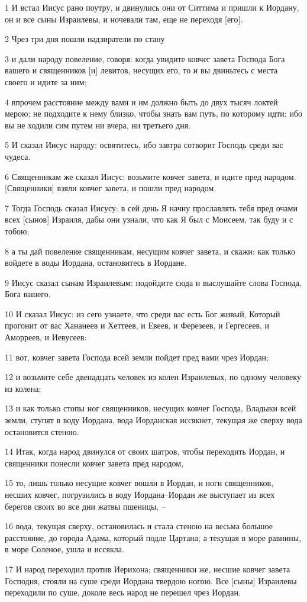 \par 1 И встал Иисус рано поутру, и двинулись они от Ситтима и пришли к Иордану, он и все сыны Израилевы, и ночевали там, еще не переходя [его].
\par 2 Чрез три дня пошли надзиратели по стану
\par 3 и дали народу повеление, говоря: когда увидите ковчег завета Господа Бога вашего и священников [и] левитов, несущих его, то и вы двиньтесь с места своего и идите за ним;
\par 4 впрочем расстояние между вами и им должно быть до двух тысяч локтей мерою; не подходите к нему близко, чтобы знать вам путь, по которому идти; ибо вы не ходили сим путем ни вчера, ни третьего дня.
\par 5 И сказал Иисус народу: освятитесь, ибо завтра сотворит Господь среди вас чудеса.
\par 6 Священникам же сказал Иисус: возьмите ковчег завета, и идите пред народом. [Священники] взяли ковчег завета, и пошли пред народом.
\par 7 Тогда Господь сказал Иисусу: в сей день Я начну прославлять тебя пред очами всех [сынов] Израиля, дабы они узнали, что как Я был с Моисеем, так буду и с тобою;
\par 8 а ты дай повеление священникам, несущим ковчег завета, и скажи: как только войдете в воды Иордана, остановитесь в Иордане.
\par 9 Иисус сказал сынам Израилевым: подойдите сюда и выслушайте слова Господа, Бога вашего.
\par 10 И сказал Иисус: из сего узнаете, что среди вас есть Бог живый, Который прогонит от вас Хананеев и Хеттеев, и Евеев, и Ферезеев, и Гергесеев, и Аморреев, и Иевусеев:
\par 11 вот, ковчег завета Господа всей земли пойдет пред вами чрез Иордан;
\par 12 и возьмите себе двенадцать человек из колен Израилевых, по одному человеку из колена;
\par 13 и как только стопы ног священников, несущих ковчег Господа, Владыки всей земли, ступят в воду Иордана, вода Иорданская иссякнет, текущая же сверху вода остановится стеною.
\par 14 Итак, когда народ двинулся от своих шатров, чтобы переходить Иордан, и священники понесли ковчег завета пред народом,
\par 15 то, лишь только несущие ковчег вошли в Иордан, и ноги священников, несших ковчег, погрузились в воду Иордана--Иордан же выступает из всех берегов своих во все дни жатвы пшеницы, --
\par 16 вода, текущая сверху, остановилась и стала стеною на весьма большое расстояние, до города Адама, который подле Цартана; а текущая в море равнины, в море Соленое, ушла и иссякла.
\par 17 И народ переходил против Иерихона; священники же, несшие ковчег завета Господня, стояли на суше среди Иордана твердою ногою. Все [сыны] Израилевы переходили по суше, доколе весь народ не перешел чрез Иордан.

